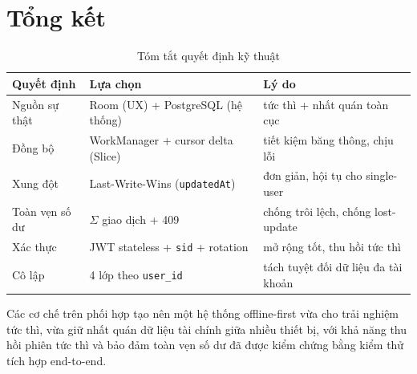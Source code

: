 \documentclass[11pt,a4paper]{article}
\begin{document}
\section{Tổng kết}
\label{sec:conclusion}

\begin{table}[ht]
\centering
\caption{Tóm tắt quyết định kỹ thuật}
\label{tab:summary}
\begin{tabular}{@{}lll@{}}
\toprule
\textbf{Quyết định} & \textbf{Lựa chọn} & \textbf{Lý do} \\
\midrule
Nguồn sự thật     & Room (UX) + PostgreSQL (hệ thống)   & tức thì + nhất quán toàn cục \\
Đồng bộ           & WorkManager + cursor delta (Slice)  & tiết kiệm băng thông, chịu lỗi \\
Xung đột          & Last-Write-Wins (\texttt{updatedAt})& đơn giản, hội tụ cho single-user \\
Toàn vẹn số dư    & $\Sigma$ giao dịch + 409             & chống trôi lệch, chống lost-update \\
Xác thực          & JWT stateless + \texttt{sid} + rotation & mở rộng tốt, thu hồi tức thì \\
Cô lập            & 4 lớp theo \texttt{user\_id}         & tách tuyệt đối dữ liệu đa tài khoản \\
\bottomrule
\end{tabular}
\end{table}

\noindent Các cơ chế trên phối hợp tạo nên một hệ thống offline-first vừa cho trải nghiệm tức
thì, vừa giữ nhất quán dữ liệu tài chính giữa nhiều thiết bị, với khả năng thu hồi phiên tức
thì và bảo đảm toàn vẹn số dư đã được kiểm chứng bằng kiểm thử tích hợp end-to-end.
\end{document}
